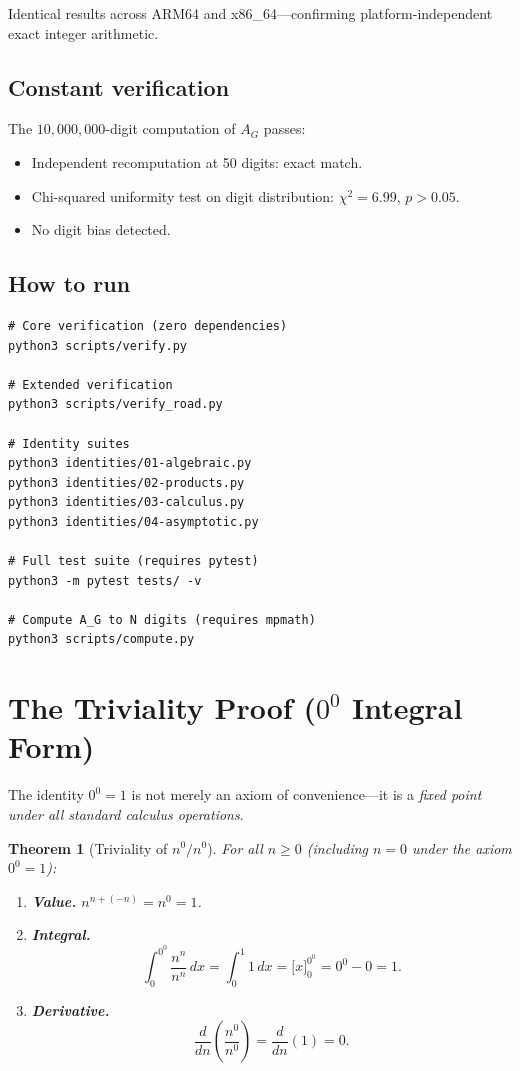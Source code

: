 \documentclass[11pt,a4paper]{article}
\newtheorem{theorem}{Theorem}[section]
\theoremstyle{definition}
\theoremstyle{remark}
\newcommand{\AG}{A_G}
\begin{document}
\noindent Identical results across ARM64 and x86\_64---confirming platform-independent exact integer arithmetic.

\subsection{Constant verification}

The $10{,}000{,}000$-digit computation of $\AG$ passes:
\begin{itemize}
  \item Independent recomputation at 50 digits: exact match.
  \item Chi-squared uniformity test on digit distribution: $\chi^{2}=6.99$, $p>0.05$.
  \item No digit bias detected.
\end{itemize}

\subsection{How to run}

\begin{verbatim}
# Core verification (zero dependencies)
python3 scripts/verify.py

# Extended verification
python3 scripts/verify_road.py

# Identity suites
python3 identities/01-algebraic.py
python3 identities/02-products.py
python3 identities/03-calculus.py
python3 identities/04-asymptotic.py

# Full test suite (requires pytest)
python3 -m pytest tests/ -v

# Compute A_G to N digits (requires mpmath)
python3 scripts/compute.py
\end{verbatim}

\section{The Triviality Proof (\texorpdfstring{$0^{0}$}{0\^0} Integral Form)}\label{sec:triviality}

The identity $0^{0}=1$ is not merely an axiom of convenience---it is a \emph{fixed point under all standard calculus operations}.

\begin{theorem}[Triviality of $n^{0}/n^{0}$]
For all $n \geq 0$ (including $n=0$ under the axiom $0^{0}=1$):
\begin{enumerate}
  \item \textbf{Value.} $n^{n+(-n)} = n^{0} = 1$.
  \item \textbf{Integral.}
  \[
    \int_{0}^{0^{0}} \frac{n^{n}}{n^{n}}\,dx
    = \int_{0}^{1} 1\,dx
    = \bigl[x\bigr]_{0}^{0^{0}}
    = 0^{0} - 0
    = 1.
  \]
  \item \textbf{Derivative.}
  \[
    \frac{d}{dn}\!\left(\frac{n^{0}}{n^{0}}\right) = \frac{d}{dn}(1) = 0.
  \]
\end{enumerate}
\end{theorem}
\end{document}
